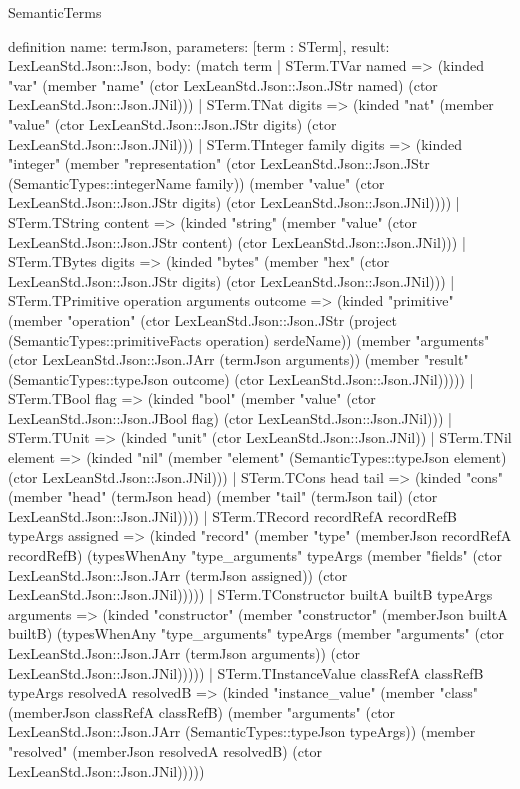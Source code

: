 \begin{lexlean}{SemanticTerms}
\begin{semanticmodule}
definition{
  name: termJson,
  parameters: [term : STerm],
  result: LexLeanStd.Json::Json,
  body: (match term
    | STerm.TVar named => (kinded "var" (member "name" (ctor LexLeanStd.Json::Json.JStr named) (ctor LexLeanStd.Json::Json.JNil)))
    | STerm.TNat digits => (kinded "nat" (member "value" (ctor LexLeanStd.Json::Json.JStr digits) (ctor LexLeanStd.Json::Json.JNil)))
    | STerm.TInteger family digits => (kinded "integer" (member "representation" (ctor LexLeanStd.Json::Json.JStr (SemanticTypes::integerName family)) (member "value" (ctor LexLeanStd.Json::Json.JStr digits) (ctor LexLeanStd.Json::Json.JNil))))
    | STerm.TString content => (kinded "string" (member "value" (ctor LexLeanStd.Json::Json.JStr content) (ctor LexLeanStd.Json::Json.JNil)))
    | STerm.TBytes digits => (kinded "bytes" (member "hex" (ctor LexLeanStd.Json::Json.JStr digits) (ctor LexLeanStd.Json::Json.JNil)))
    | STerm.TPrimitive operation arguments outcome => (kinded "primitive" (member "operation" (ctor LexLeanStd.Json::Json.JStr (project (SemanticTypes::primitiveFacts operation) serdeName)) (member "arguments" (ctor LexLeanStd.Json::Json.JArr (termJson arguments)) (member "result" (SemanticTypes::typeJson outcome) (ctor LexLeanStd.Json::Json.JNil)))))
    | STerm.TBool flag => (kinded "bool" (member "value" (ctor LexLeanStd.Json::Json.JBool flag) (ctor LexLeanStd.Json::Json.JNil)))
    | STerm.TUnit => (kinded "unit" (ctor LexLeanStd.Json::Json.JNil))
    | STerm.TNil element => (kinded "nil" (member "element" (SemanticTypes::typeJson element) (ctor LexLeanStd.Json::Json.JNil)))
    | STerm.TCons head tail => (kinded "cons" (member "head" (termJson head) (member "tail" (termJson tail) (ctor LexLeanStd.Json::Json.JNil))))
    | STerm.TRecord recordRefA recordRefB typeArgs assigned => (kinded "record" (member "type" (memberJson recordRefA recordRefB) (typesWhenAny "type_arguments" typeArgs (member "fields" (ctor LexLeanStd.Json::Json.JArr (termJson assigned)) (ctor LexLeanStd.Json::Json.JNil)))))
    | STerm.TConstructor builtA builtB typeArgs arguments => (kinded "constructor" (member "constructor" (memberJson builtA builtB) (typesWhenAny "type_arguments" typeArgs (member "arguments" (ctor LexLeanStd.Json::Json.JArr (termJson arguments)) (ctor LexLeanStd.Json::Json.JNil)))))
    | STerm.TInstanceValue classRefA classRefB typeArgs resolvedA resolvedB => (kinded "instance_value" (member "class" (memberJson classRefA classRefB) (member "arguments" (ctor LexLeanStd.Json::Json.JArr (SemanticTypes::typeJson typeArgs)) (member "resolved" (memberJson resolvedA resolvedB) (ctor LexLeanStd.Json::Json.JNil)))))
}
\end{semanticmodule}
\end{lexlean}
